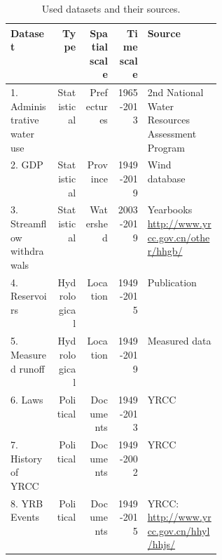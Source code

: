 
\begin{table}[!htbp]
    \begin{center}
    \caption{Used datasets and their sources.}\label{tab:datasets}%
    \begin{tabular}{lrrrp{0.35\linewidth}}
    \hline
    Dataset & Type & Spatial scale & Time scale & Source \\
    \hline
    1. Administrative water use & Statistical & Prefectures & 1965-2013 & 2nd National Water Resources Assessment Program \cite{zhou2020}\\
    2. GDP & Statistical & Province & 1949-2019 & Wind database \\
    3. Streamflow withdrawals & Statistical & Watershed & 2003-2019 & Yearbooks \url{http://www.yrcc.gov.cn/other/hhgb/} \\
    4. Reservoirs & Hydrological & Location & 1949-2015 & Publication \cite{wang2019c} \\
    5. Measured runoff & Hydrological & Location & 1949-2019 & Measured data \cite{wang2019c,wang2016e} \\
    6. Laws & Political & Documents & 1949-2013 & YRCC \cite{yellowriverconservancycommission2013} \\
    7. History of YRCC & Political & Documents & 1949-2002 & YRCC \cite{yellowriverarchives2004} \\
    8. YRB Events & Political & Documents & 1949-2015 & YRCC: \url{http://www.yrcc.gov.cn/hhyl/hhjs/} \\
    \hline
    \end{tabular}
    \end{center}
    \end{table}

